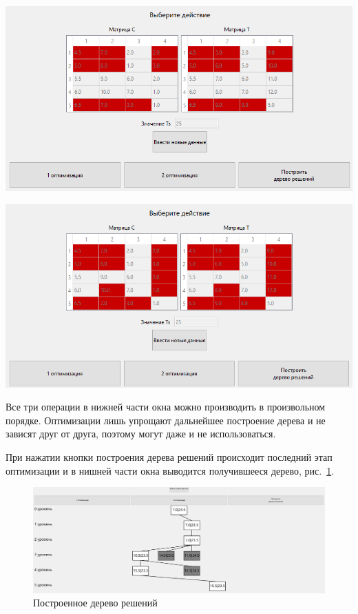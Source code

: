 	{\noindent\begin{minipage}{.5\textwidth}
		\includegraphics[width=\textwidth]{png/prog4.png}
	\end{minipage}	
	\begin{minipage}{.5\textwidth}
		\includegraphics[width=\textwidth]{png/prog5.png}
	\end{minipage} 
	\label{optimize_prog}}

	Все три операции в нижней части окна можно производить в произвольном порядке. Оптимизации лишь упрощают дальнейшее построение дерева и не зависят друг от друга, поэтому могут даже и не использоваться. 
	
	При нажатии кнопки построения дерева решений происходит последний этап оптимизации и в нишней части окна выводится получившееся дерево, рис.~\ref{tree_screenshot}. 
	
	\begin{figure}
		\centering\includegraphics[width=.8\textwidth]{png/tree.png}
		\caption{Построенное дерево решений}
		\label{tree_screenshot}
	\end{figure}

